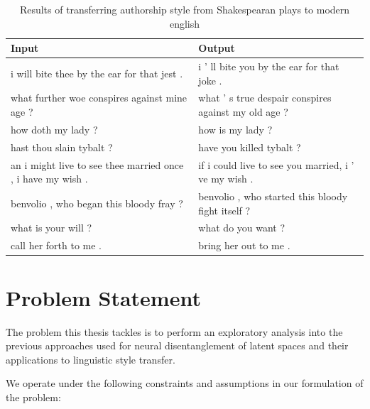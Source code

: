 \begin{table}[ht]
	\centering
	\begin{tabular}{ | p{.45\linewidth} | p{.45\linewidth} | }
		\hline
		\textbf{Input}                                              & \textbf{Output}                                      \\
		\hline \hline
		i will bite thee by the ear for that jest .                 & i ’ ll bite you by the ear for that joke .           \\
		\hline
		what further woe conspires against mine age ?               & what ’ s true despair conspires against my old age ? \\
		\hline
		how doth my lady ?                                          & how is my lady ?                                     \\
		\hline
		hast thou slain tybalt ?                                    & have you killed tybalt ?                             \\
		\hline
		an i might live to see thee married once , i have my wish . & if i could live to see you married, i ’ ve my wish . \\
		\hline
		benvolio , who began this bloody fray ?                     & benvolio , who started this bloody fight itself ?    \\
		\hline
		what is your will ?                                         & what do you want ?                                   \\
		\hline
		call her forth to me .                                      & bring her out to me .                                \\
		\hline
	\end{tabular}
	\label{table:paraphrasing-for-style-results}
	\caption{Results of transferring authorship style from Shakespearan plays to modern english}
\end{table}


\section{Problem Statement}

The problem this thesis tackles is to perform an exploratory analysis into the previous approaches used for neural disentanglement of latent spaces and their applications to linguistic style transfer.

We operate under the following constraints and assumptions in our formulation of the problem:

